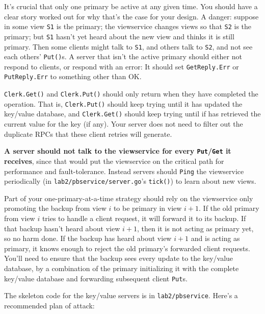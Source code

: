 \documentclass{article}
\newcommand{\code}{\texttt}
\begin{document}
It's crucial that only one primary be active at any given time. You should have a clear story worked out for why that's the case for your design. A danger: suppose in some view \code{S1} is the primary; the viewservice changes views so that \code{S2} is the primary; but \code{S1} hasn't yet heard about the new view and thinks it is still primary. Then some clients might talk to \code{S1}, and others talk to \code{S2}, and not see each others' \code{Put()}s. A server that isn't the active primary should either not respond to clients, 
or respond with an error: It should set \code{GetReply.Err} or \code{PutReply.Err} to something other than OK. 

\code{Clerk.Get()} and \code{Clerk.Put()} should only return when they have completed the operation. That is, \code{Clerk.Put()} should keep trying until it has updated the key/value database, and \code{Clerk.Get()} should keep trying until if has retrieved the current value for the key (if any). Your server does not need to filter out the duplicate RPCs that these client retries will generate. 

\textbf{A server should not talk to the viewservice for every \code{Put}/\code{Get} it receives}, since that would put the viewservice on the critical path for performance and fault-tolerance. Instead servers should \code{Ping} the viewservice periodically (in \code{lab2/pbservice/server.go}'s \code{tick()}) to learn about new views. 

Part of your one-primary-at-a-time strategy should rely on the viewservice only promoting the backup from view $i$ to be primary in view $i + 1$. If the old primary from view $i$ tries to handle a client request, it will forward it to its backup. If that backup hasn't heard about view $i + 1$, then it is not acting as primary yet, so no harm done. If the backup has heard about view $i + 1$ and is acting as primary, it knows enough to reject the old primary's forwarded client requests. You'll need to ensure that the backup sees every update to the key/value database, by a combination of the primary initializing it with the complete key/value database and forwarding subsequent client \code{Put}s. 

The skeleton code for the key/value servers is in \code{lab2/pbservice}. Here's a recommended plan of attack: 
\end{document}
